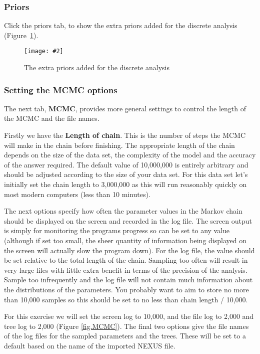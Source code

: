 \documentclass{article}
\newcommand{\includeimage}[2][]{%
\texttt{[image: \#2]}
}
\begin{document}
\subsubsection*{Priors}

Click the priors tab, to show the extra priors added for the discrete analysis (Figure~\ref{fig.BEAUti_priors2}).

\begin{figure}
\centering	
\includeimage[scale=0.3,clip=true,trim=0 400 0 0]{figures/BEAUti_priors2}
\caption{The extra priors added for the discrete analysis}
\label{fig.BEAUti_priors2}
\end{figure}

\subsubsection*{Setting the MCMC options }

The next tab, {\bf MCMC}, provides more general
settings to control the length of the MCMC and the file names. 

Firstly we have the \textbf{Length of chain}. This is the number of
steps the MCMC will make in the chain before finishing. The appropriate length of the chain depends on the size of the data set, the complexity of the
model and the accuracy of the answer required. The default value of 10,000,000
is entirely arbitrary and should be adjusted according to the size
of your data set. For this data set let's initially set the chain
length to 3,000,000 as this will run reasonably quickly on most modern
computers (less than 10 minutes).

The next options specify how often the parameter values in the Markov
chain should be displayed on the screen and recorded in the log file.
The screen output is simply for monitoring the programs progress so
can be set to any value (although if set too small, the sheer quantity
of information being displayed on the screen will actually slow the
program down). For the log file, the value should be set relative
to the total length of the chain. Sampling too often will result in
very large files with little extra benefit in terms of the precision
of the analysis. Sample too infrequently and the log file will not
contain much information about the distributions of the parameters. 
You probably want to aim to store no more than 10,000 samples so this should be
set to no less than chain length / 10,000.

For this exercise we will set the screen log to 10,000, and the file log to 2,000 and tree log to 2,000 (Figure \ref{fig.MCMC}). The final two options give the file names of the log files for the sampled parameters and
the trees. These will be set to a default based on the name of the
imported NEXUS file. 
\end{document}
